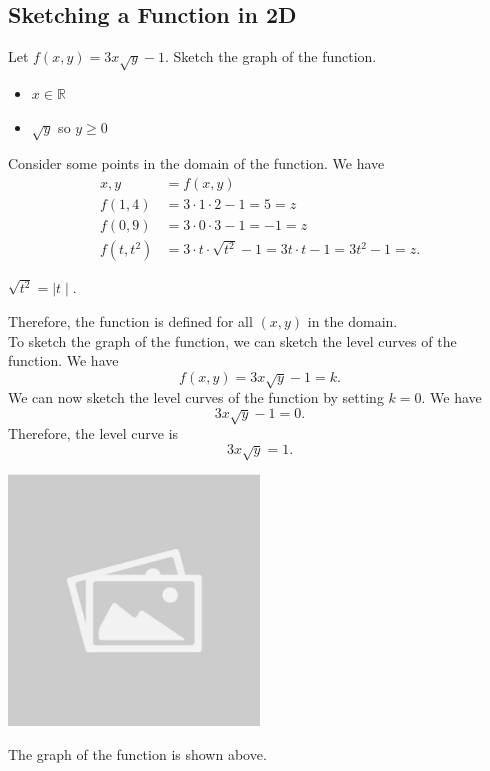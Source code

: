 \documentclass{article}
\begin{document}
\subsection*{Sketching a Function in 2D}
\begin{examplebox}
Let \( f(x, y) = 3x\sqrt{y} - 1 \). Sketch the graph of the function.
\begin{solutionbox}
\begin{notebox}
\begin{itemize}
    \item \( x \in \mathbb{R} \)
    \item \( \sqrt{y} \) so \( y \geq 0 \) 
\end{itemize}
\end{notebox}
Consider some points in the domain of the function. We have
\begin{align*}
    x, y &= f(x, y) \\
    f(1, 4) &= 3 \cdot 1 \cdot 2 - 1 = 5 = z \\
    f(0, 9) &= 3 \cdot 0 \cdot 3 - 1 = -1 = z \\
    f(t, t^2) &= 3 \cdot t \cdot \sqrt{t^2} - 1 = 3t \cdot t - 1 = 3t^2 - 1 = z.
\end{align*}
\begin{notebox}
\( \sqrt{t^2} = \mid t \mid \).
\end{notebox}

Therefore, the function is defined for all \( (x, y) \) in the domain.
\\
To sketch the graph of the function, we can sketch the level curves of the function. We have
\[
    f(x, y) = 3x\sqrt{y} - 1 = k.
\]
We can now sketch the level curves of the function by setting \( k = 0 \). We have
\[
    3x\sqrt{y} - 1 = 0.
\]
Therefore, the level curve is
\[
    3x\sqrt{y} = 1.
\]
\begin{center}
    \includegraphics[width=0.5\textwidth]{sample_image.jpg}
\end{center}
\begin{answerbox}
The graph of the function is shown above.
\end{answerbox}
\end{solutionbox}
\end{examplebox}
\end{document}
